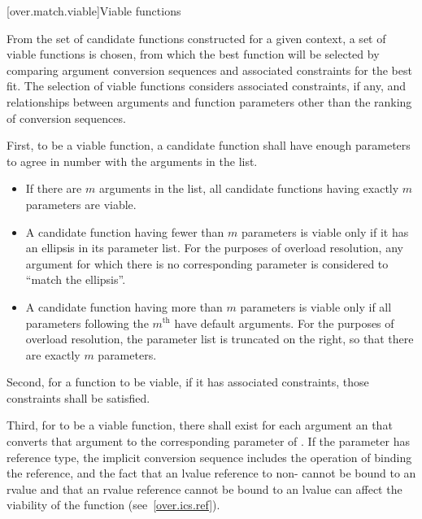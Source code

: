 %

[over.match.viable]{Viable functions}%

\pnum
From the set of candidate functions constructed for a given
context, a set of viable functions is
chosen, from which the best function will be selected by
comparing argument conversion sequences
and associated constraints
for the best fit.
The selection of viable functions considers
associated constraints, if any, and
relationships between arguments and function parameters other
than the ranking of conversion sequences.

\pnum
{}%
%
First, to be a viable function, a candidate function shall have
enough parameters to agree in number with the arguments in the
list.

\begin{itemize}
\item
If there are $m$ arguments in the list,
all candidate functions having exactly $m$ parameters are viable.
\item
A candidate function having fewer than $m$ parameters is viable
only if it has an ellipsis in its parameter list.
For the purposes of overload resolution,
any argument for which there is no corresponding parameter is
considered to ``match the ellipsis''.
\item
A candidate function having more than $m$ parameters is viable
only if all parameters following the $m^\text{th}$
have default arguments.
For the purposes of overload resolution,
the parameter list is truncated on the right,
so that there are exactly $m$ parameters.
\end{itemize}

\pnum
Second, for a function to be viable, if it has associated constraints,
those constraints shall be satisfied.

\pnum
Third, for
to be a viable function, there shall exist for each
argument an
 that
converts that argument to the corresponding parameter of
.
If the parameter has reference type, the implicit conversion sequence
includes the operation of binding the reference, and the fact that
an lvalue reference to non- cannot be bound to an rvalue
and that an rvalue reference cannot be bound to an lvalue
can affect
the viability of the function (see~\ref{over.ics.ref}).

